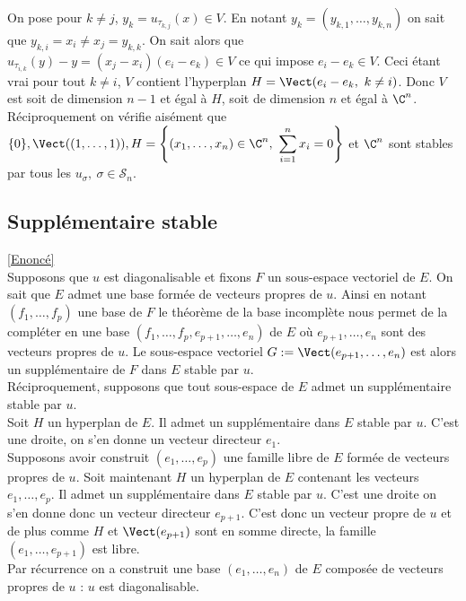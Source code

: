 \documentclass[8pt]{book}
\begin{document}
\begin{enumerate}[leftmargin=*]
		On pose pour $k\ne j$, $y_k=u_{\tau_{k,j}}(x)\in V$. En notant $y_k=(y_{k,1},\dots,y_{k,n})$ on sait que $y_{k,i}=x_i\ne x_j=y_{k,k}$. On sait alors que $u_{\tau_{i,k}}(y)-y=(x_j-x_i)(e_i-e_k)\in V$ ce qui impose $e_i-e_k\in V$. Ceci étant vrai pour tout $k\ne i$, $V$ contient l'hyperplan $H=\Vect(e_i-e_k,\ k\ne i)$. Donc $V$ est soit de dimension $n-1$ et égal à $H$, soit de dimension $n$ et égal à $\C^n$.\\
		Réciproquement on vérifie aisément que $\{0\},\Vect((1,\dots,1)),H=\left\{(x_1,\dots,x_n)\in \C^n,\ \displaystyle\sum_{i=1}^nx_i=0\right\}$ et $\C^n$ sont stables par tous les $u_\sigma,\ \sigma\in \mathcal S_n$.
	\end{enumerate}
	
	\subsection{Supplémentaire stable }
	\label{Supplémentaire stable corrigé}
	\textcolor{blue}{\hyperref[Supplémentaire stable]{[Enoncé]}}\\
	Supposons que $u$ est diagonalisable et fixons $F$ un sous-espace vectoriel de $E$. On sait que $E$ admet une base formée de vecteurs propres de $u$. Ainsi en notant $(f_1,\dots,f_p)$ une base de $F$ le théorème de la base incomplète nous permet de la compléter en une base $(f_1,\dots,f_p,e_{p+1},\dots,e_n)$ de $E$ où $e_{p+1},\dots,e_n$ sont des vecteurs propres de $u$. Le sous-espace vectoriel $G:=\Vect(e_{p+1},\dots,e_n)$ est alors un supplémentaire de $F$ dans $E$ stable par $u$.\\
	Réciproquement, supposons que tout sous-espace de $E$ admet un supplémentaire stable par $u$.\\
	Soit $H$ un hyperplan de $E$. Il admet un supplémentaire dans $E$ stable par $u$. C'est une droite, on s'en donne un vecteur directeur $e_1$.\\
	Supposons avoir construit $(e_1,\dots,e_p)$ une famille libre de $E$ formée de vecteurs propres de $u$. Soit maintenant $H$ un hyperplan de $E$ contenant les vecteurs $e_1,\dots,e_p$. Il admet un supplémentaire dans $E$ stable par $u$. C'est une droite on s'en donne donc un vecteur directeur $e_{p+1}$. C'est donc un vecteur propre de $u$ et de plus comme $H$ et $\Vect(e_{p+1})$ sont en somme directe, la famille $(e_1,\dots,e_{p+1})$ est libre.\\
	Par récurrence on a construit une base $(e_1,\dots,e_n)$ de $E$ composée de vecteurs propres de $u$ : $u$ est diagonalisable.
	
\end{document}
